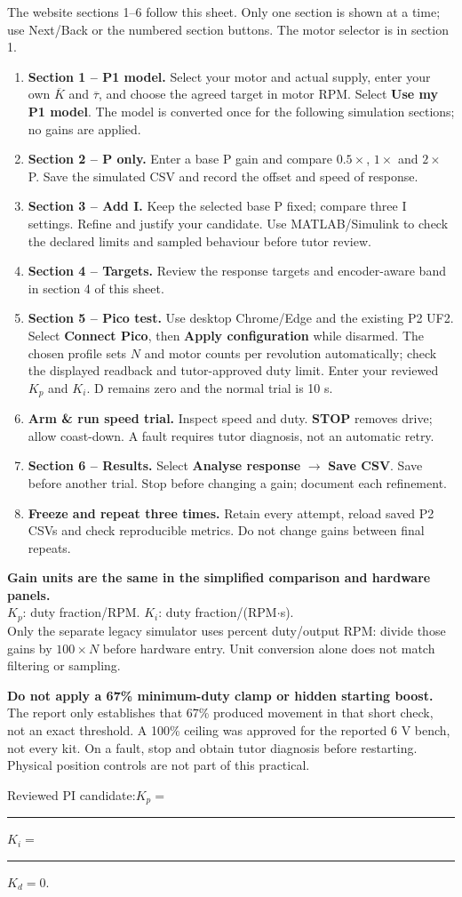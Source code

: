 \documentclass[10pt,a4paper]{article}
\newcommand{\sect}[1]{\par\vspace{5pt}{\fontsize{13}{15.4}\selectfont\color{accent}\bfseries #1}\par\vspace{2pt}}
\newcommand{\note}[1]{\par\vspace{4pt}\begingroup\setlength{\fboxsep}{8pt}\colorbox{soft}{\parbox{\dimexpr\linewidth-16pt\relax}{#1}}\endgroup\par\vspace{4pt}}
\newcommand{\ui}[1]{\textbf{#1}}
\newcommand{\blank}[1]{\rule{#1}{0.35pt}}
\begin{document}
\newpage
\sect{5. Website and Pico workflow}
The website sections 1--6 follow this sheet. Only one section is shown at a time; use Next/Back or the numbered section buttons. The motor selector is in section 1.
\begin{enumerate}[itemsep=8pt]
\item \textbf{Section 1 -- P1 model.} Select your motor and actual supply, enter your own $\overline K$ and $\overline\tau$, and choose the agreed target in motor RPM. Select \ui{Use my P1 model}. The model is converted once for the following simulation sections; no gains are applied.
\item \textbf{Section 2 -- P only.} Enter a base P gain and compare $0.5\times$, $1\times$ and $2\times$ P. Save the simulated CSV and record the offset and speed of response.
\item \textbf{Section 3 -- Add I.} Keep the selected base P fixed; compare three I settings. Refine and justify your candidate. Use MATLAB/Simulink to check the declared limits and sampled behaviour before tutor review.
\item \textbf{Section 4 -- Targets.} Review the response targets and encoder-aware band in section 4 of this sheet.
\item \textbf{Section 5 -- Pico test.} Use desktop Chrome/Edge and the existing P2 UF2. Select \ui{Connect Pico}, then \ui{Apply configuration} while disarmed. The chosen profile sets $N$ and motor counts per revolution automatically; check the displayed readback and tutor-approved duty limit. Enter your reviewed $K_p$ and $K_i$. D remains zero and the normal trial is 10 s.
\item \textbf{Arm \& run speed trial.} Inspect speed and duty. \ui{STOP} removes drive; allow coast-down. A fault requires tutor diagnosis, not an automatic retry.
\item \textbf{Section 6 -- Results.} Select \ui{Analyse response} $\to$ \ui{Save CSV}. Save before another trial. Stop before changing a gain; document each refinement.
\item \textbf{Freeze and repeat three times.} Retain every attempt, reload saved P2 CSVs and check reproducible metrics. Do not change gains between final repeats.
\end{enumerate}
\note{\textbf{Gain units are the same in the simplified comparison and hardware panels.}\\
$K_p$: duty fraction/RPM. $K_i$: duty fraction/(RPM$\cdot$s).\\
Only the separate legacy simulator uses percent duty/output RPM: divide those gains by $100\times N$ before hardware entry. Unit conversion alone does not match filtering or sampling.}
\note{\textbf{Do not apply a 67\% minimum-duty clamp or hidden starting boost.} The report only establishes that 67\% produced movement in that short check, not an exact threshold. A 100\% ceiling was approved for the reported 6 V bench, not every kit. On a fault, stop and obtain tutor diagnosis before restarting. Physical position controls are not part of this practical.}
\vspace{10pt}
Reviewed PI candidate:\quad $K_p=$ \blank{28mm}\quad $K_i=$ \blank{28mm}\quad $K_d=0$.
\end{document}
